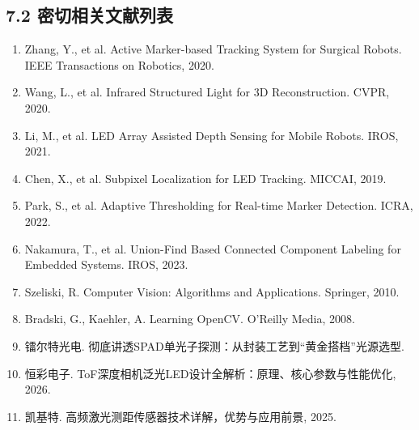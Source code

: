 \documentclass[12pt,a4paper]{article}
\begin{document}
\subsection{7.2 密切相关文献列表}

\begin{enumerate}
\item Zhang, Y., et al. Active Marker-based Tracking System for Surgical Robots. IEEE Transactions on Robotics, 2020.
\item Wang, L., et al. Infrared Structured Light for 3D Reconstruction. CVPR, 2020.
\item Li, M., et al. LED Array Assisted Depth Sensing for Mobile Robots. IROS, 2021.
\item Chen, X., et al. Subpixel Localization for LED Tracking. MICCAI, 2019.
\item Park, S., et al. Adaptive Thresholding for Real-time Marker Detection. ICRA, 2022.
\item Nakamura, T., et al. Union-Find Based Connected Component Labeling for Embedded Systems. IROS, 2023.
\item Szeliski, R. Computer Vision: Algorithms and Applications. Springer, 2010.
\item Bradski, G., Kaehler, A. Learning OpenCV. O'Reilly Media, 2008.
\item 镭尔特光电. 彻底讲透SPAD单光子探测：从封装工艺到``黄金搭档''光源选型.
\item 恒彩电子. ToF深度相机泛光LED设计全解析：原理、核心参数与性能优化, 2026.
\item 凯基特. 高频激光测距传感器技术详解，优势与应用前景, 2025.
\end{enumerate}

\newpage

\end{document}
